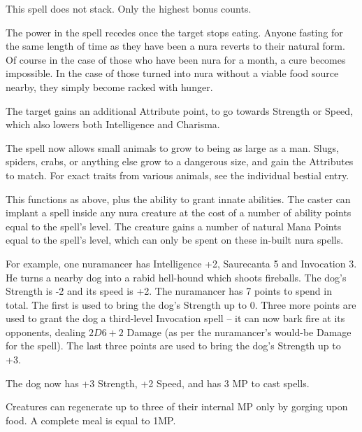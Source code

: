 \begin{multicols}{2}
This spell does not stack.
Only the highest bonus counts.

The power in the spell recedes once the target stops eating.
Anyone fasting for the same length of time as they have been a nura reverts to their natural form.
Of course in the case of those who have been nura for a month, a cure becomes impossible.
In the case of those turned into nura without a viable food source nearby, they simply become racked with hunger.
\label{nura_recovery}

The target gains an additional Attribute point, to go towards Strength or Speed, which also lowers both Intelligence and Charisma.


The spell now allows small animals to grow to being as large as a man.
Slugs, spiders, crabs, or anything else grow to a dangerous size, and gain the Attributes to match.
For exact traits from various animals, see the individual bestial entry.

\spelllevel
{}

This functions as above, plus the ability to grant innate abilities.  The caster can implant a spell inside any nura creature at the cost of a number of ability points equal to the spell's level.  The creature gains a number of natural Mana Points equal to the spell's level, which can only be spent on these in-built nura spells.

\begin{exampletext}

For example, one nuramancer has Intelligence +2, Saurecanta 5 and Invocation 3.
He turns a nearby dog into a rabid hell-hound which shoots fireballs.
The dog's Strength is -2 and its speed is +2.
The nuramancer has 7 points to spend in total.
The first is used to bring the dog's Strength up to 0.
Three more points are used to grant the dog a third-level Invocation spell -- it can now bark fire at its opponents, dealing $2D6+2$ Damage (as per the nuramancer's would-be Damage for the spell).
The last three points are used to bring the dog's Strength up to +3.

The dog now has +3 Strength, +2 Speed, and has 3 MP to cast spells.

\end{exampletext}

Creatures can regenerate up to three of their internal MP only by gorging upon food.  A complete meal is equal to 1MP.

\end{multicols}

